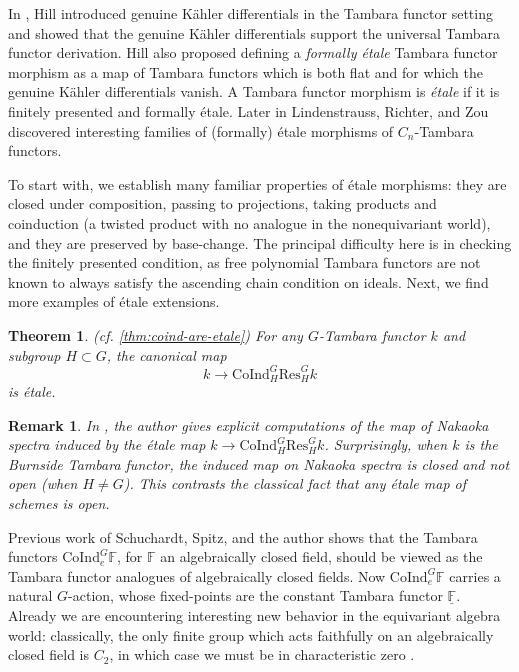 \documentclass[11pt,dvipsnames]{amsart}
\newcommand{\F}{\mathbb{F}}
\newtheorem{letterthm}{Theorem}
\theoremstyle{BoldRemark}
\newtheorem{remark}[theorem]{Remark}
\newcommand{\Res}{\mathrm{Res}}
\newcommand{\Coind}{\mathrm{CoInd}}
\begin{document}
In \cite{Hil17}, Hill introduced genuine K\"{a}hler differentials in the Tambara functor setting and showed that the genuine K\"{a}hler differentials support the universal Tambara functor derivation. Hill also proposed defining a \emph{formally \'{e}tale} Tambara functor morphism as a map of Tambara functors which is both flat and for which the genuine K\"{a}hler differentials vanish. A Tambara functor morphism is \emph{\'{e}tale} if it is finitely presented and formally \'{e}tale. Later in \cite{LRZ24} Lindenstrauss, Richter, and Zou discovered interesting families of (formally) \'{e}tale morphisms of $C_n$-Tambara functors.

To start with, we establish many familiar properties of \'{e}tale morphisms: they are closed under composition, passing to projections, taking products and coinduction (a twisted product with no analogue in the nonequivariant world), and they are preserved by base-change. The principal difficulty here is in checking the finitely presented condition, as free polynomial Tambara functors are not known to always satisfy the ascending chain condition on ideals. Next, we find more examples of \'{e}tale extensions.

\begin{letterthm}(cf. \cref{thm:coind-are-etale})
    For any $G$-Tambara functor $k$ and subgroup $H \subset G$, the canonical map 
    \[ 
        k \rightarrow \Coind_H^G \Res_H^G k 
    \] 
    is \'{e}tale.
\end{letterthm}

\begin{remark}
    In \cite{Wis25b}, the author gives explicit computations of the map of Nakaoka spectra induced by the \'{e}tale map $k \rightarrow \Coind_H^G \Res_H^G k$. Surprisingly, when $k$ is the Burnside Tambara functor, the induced map on Nakaoka spectra is closed and not open (when $H \neq G$). This contrasts the classical fact that any \'{e}tale map of schemes is open.
\end{remark}

Previous work of Schuchardt, Spitz, and the author shows that the Tambara functors $\Coind_e^G \F$, for $\F$ an algebraically closed field, should be viewed as the Tambara functor analogues of algebraically closed fields. Now $\Coind_e^G \F$ carries a natural $G$-action, whose fixed-points are the constant Tambara functor $\underline{\F}$. Already we are encountering interesting new behavior in the equivariant algebra world: classically, the only finite group which acts faithfully on an algebraically closed field is $C_2$, in which case we must be in characteristic zero \cite{AS27a, AS27b}. 
\end{document}
